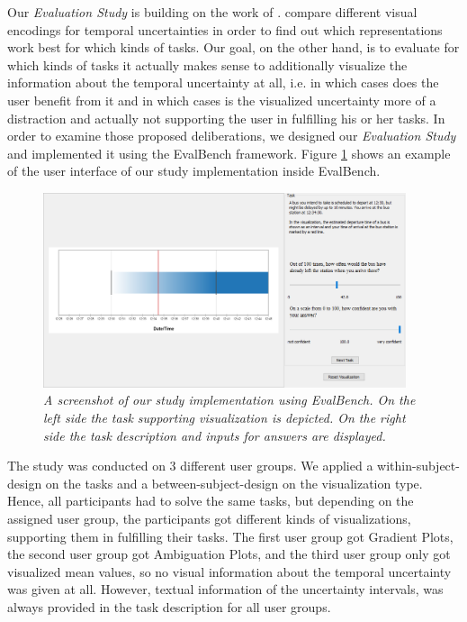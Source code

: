 Our \textit{Evaluation Study} is building on the work of \citet{gschwandtner2016visual}. \citet{gschwandtner2016visual} compare different visual encodings for temporal uncertainties in order to find out which representations work best for which kinds of tasks. Our goal, on the other hand, is to evaluate for which kinds of tasks it actually makes sense to additionally visualize the information about the temporal uncertainty at all, i.e. in which cases does the user benefit from it and in which cases is the visualized uncertainty more of a distraction and actually not supporting the user in fulfilling his or her tasks. In order to examine those proposed deliberations, we designed our \textit{Evaluation Study} and implemented it using the EvalBench framework. Figure \ref{fig:EvalBench_GUI} shows an example of the user interface of our study implementation inside EvalBench. \par \medskip

\begin{figure}[H]
	\centering
	\includegraphics[width=0.95\textwidth]{figures/EvalBench_GUI.png}
	\caption{\textit{A screenshot of our study implementation using EvalBench. On the left side the task supporting visualization is depicted. On the right side the task description and inputs for answers are displayed.}}
	\label{fig:EvalBench_GUI}
\end{figure}

The study was conducted on 3 different user groups. We applied a within-subject-design on the tasks and a between-subject-design on the visualization type. Hence, all participants had to solve the same tasks, but depending on the assigned user group, the participants got different kinds of visualizations, supporting them in fulfilling their tasks. The first user group got Gradient Plots, the second user group got Ambiguation Plots, and the third user group only got visualized mean values, so no visual information about the temporal uncertainty was given at all. However, textual information of the uncertainty intervals, was always provided in the task description for all user groups. \par \medskip


